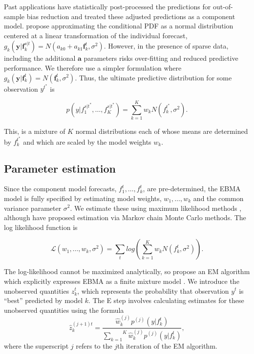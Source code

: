 \documentclass[12pt,fullpage,endnotes]{article}
\begin{document}
Past applications have statistically post-processed the predictions for
out-of-sample bias reduction and treated these adjusted predictions as a
component model. \citet{Raftery:2005} propose approximating the
conditional PDF as a normal distribution centered at a linear
transformation of the individual forecast,
$g_k(\mathbf{y}|\mathbf{f}_k^{s|t}) = N(a_{k0} +
a_{k1}\mathbf{f}_k^{t}, \sigma^2)$. However, in the presence of sparse
data, including the additional $\mathbf{a}$ parameters risks
over-fitting and reduced predictive performance.  We therefore use a
simpler formulation where $g_k(\mathbf{y}|\mathbf{f}_k^{t}) =
N(\mathbf{f}_k^{t}, \sigma^2)$.  Thus, the ultimate predictive
distribution for some observation $y^{t^\ast}$ is 

\begin{equation}
\label{pdf}p(y|f_1^{s|t^\ast},
\ldots, f_K^{s|t^\ast}) = \overset{K}{\underset{k=1}{\sum}} w_k
N(f_k^{t^\ast}, \sigma^2).
\end{equation}

\noindent This, is a mixture of $K$ normal distributions each of whose
means are determined by $f_k^{t^\ast}$ and which are scaled by the
model weights $w_k$.

\subsection{Parameter estimation}

Since the component model forecasts, $f^t_1, \ldots, f^t_k$, are
pre-determined, the EBMA model is fully specified by estimating model
weights, $w_1, \ldots, w_k$ and the common variance parameter
$\sigma^2$.  We estimate these using maximum likelihood methods
\citep{Raftery:2005}, although \citet{Vrugt:2008} have proposed
estimation via Markov chain Monte Carlo methods.  The log likelihood
function is

\begin{equation}
\mathcal{L}(w_1, \ldots, w_k, \sigma^2)=\sum_tlog\left(\sum_{k=1}^Kw_kN(f^t_k, \sigma^2) \right).
\end{equation}


\noindent The log-likelihood cannot be maximized analytically, so
\citet{Raftery:2005} propose an EM algorithm which explicitly
expresses EBMA as a finite mixture model
\cite{mclachlan:peel:2000,imai:tingley:2012}.  We introduce the
unobserved quantities $z_k^t$, which represents the probability that
observation $y^t$ is ``best'' predicted by model $k$.  The E step
involves calculating estimates for these unobserved quantities using
the formula
\begin{equation}
\label{E-step}
\hat{z}^{(j+1)t}_{k} = \frac{\hat{w}^{(j)}_k
p^{(j)}(y|f_{k}^{t})}{\overset{K}{\underset{k=1}{\sum}}\hat{w}^{(j)}_kp^{(j)}(y|f_{k}^{t})},
\end{equation}
\noindent where the superscript $j$ refers to the $j$th iteration of
the EM algorithm.
\end{document}
